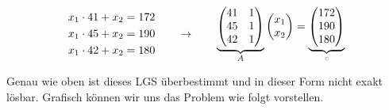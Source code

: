 \begin{equation*}
    \begin{aligned}
        x_1\cdot 41 + x_2&= 172 \\
        x_1\cdot 45 + x_2&= 190 \\
        x_1\cdot 42 + x_2&= 180 \\
    \end{aligned} \qquad \rightarrow \qquad
    \begin{aligned}
        \underbrace{
        \begin{pmatrix}
            41 & 1 \\
            45 & 1 \\
            42 & 1 \\
        \end{pmatrix}}_{A}
        \begin{pmatrix}
            x_1\\ x_2
        \end{pmatrix}
        =
        \underbrace{
        \begin{pmatrix}
            172 \\ 190 \\ 180
        \end{pmatrix}}_{\textcolor{customblue}{c}} \\
    \end{aligned}
\end{equation*}

Genau wie oben ist dieses LGS überbestimmt und in dieser Form nicht exakt lösbar. Grafisch können wir uns das Problem wie folgt vorstellen. 

\newpage

